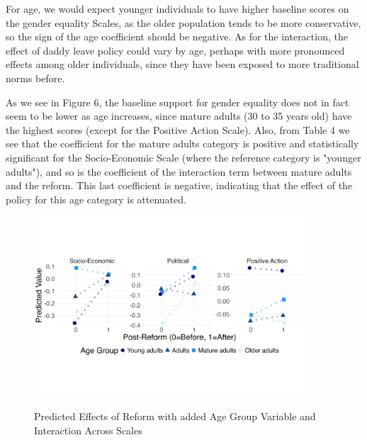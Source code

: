 \documentclass[12pt,letterpaper]{article}
\begin{document}
\begin{enumerate}
	\noindent For age, we would expect younger individuals to have higher baseline scores on the gender equality Scales, as the older population tends to be more conservative, so the sign of the age coefficient should be negative. As for the interaction, the effect of daddy leave policy could vary by age, perhaps with more pronounced effects among older individuals, since they have been exposed to more traditional norms before. 
	
	\noindent As we see in Figure 6, the baseline support for gender equality does not in fact seem to be lower as age increases, since mature adults (30 to 35 years old) have the highest scores (except for the Positive Action Scale). Also, from Table 4 we see that the coefficient for the mature adults category is positive and statistically significant for the Socio-Economic Scale (where the reference category is "younger adults"), and so is the coefficient of the interaction term between mature adults and the reform. This last coefficient is negative, indicating that the effect of the policy for this age category is attenuated. 
	
	\begin{figure}[H]
		\centering
		\caption{Predicted Effects of Reform with added Age Group Variable and Interaction Across Scales}
		\vspace{-1cm}
		\includegraphics[width=0.9\textwidth]{age_plot}
		\label{fig:age_plot}
	\end{figure}
	

\end{enumerate}
\end{document}

